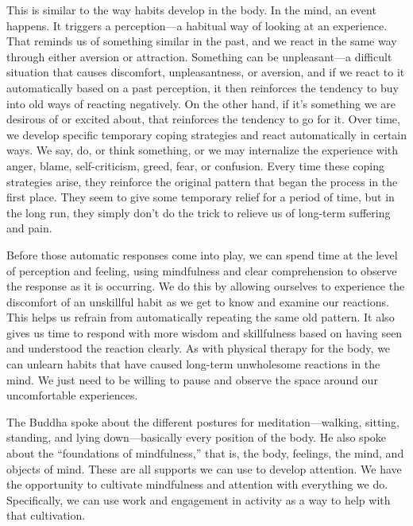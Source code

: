 This is similar to the way habits develop in the body. In the mind, an 
event happens. It triggers a perception---a habitual way of looking at 
an experience. That reminds us of something similar in the past, and we 
react in the same way through either aversion or attraction. Something 
can be unpleasant---a difficult situation that causes discomfort, 
unpleasantness, or aversion, and if we react to it automatically based 
on a past perception, it then reinforces the tendency to buy into old 
ways of reacting negatively. On the other hand, if it's something we 
are desirous of or excited about, that reinforces the tendency to go 
for it. Over time, we develop specific temporary coping strategies and 
react automatically in certain ways. We say, do, or think something, or 
we may internalize the experience with anger, blame, self-criticism, 
greed, fear, or confusion. Every time these coping strategies arise, 
they reinforce the original pattern that began the process in the first 
place. They seem to give some temporary relief for a period of time, 
but in the long run, they simply don't do the trick to relieve us of 
long-term suffering and pain.

Before those automatic responses come into play, we can spend time at 
the level of perception and feeling, using mindfulness and clear 
comprehension to observe the response as it is occurring. We do this by 
allowing ourselves to experience the discomfort of an unskillful habit 
as we get to know and examine our reactions. This helps us refrain from 
automatically repeating the same old pattern. It also gives us time to 
respond with more wisdom and skillfulness based on having seen and 
understood the reaction clearly. As with physical therapy for the body, 
we can unlearn habits that have caused long-term unwholesome reactions 
in the mind. We just need to be willing to pause and observe the space 
around our uncomfortable experiences.


The Buddha spoke about the different postures for meditation---walking, 
sitting, standing, and lying down---basically every position of the 
body. He also spoke about the ``foundations of mindfulness,'' that is, 
the body, feelings, the mind, and objects of mind. These are all 
supports we can use to develop attention. We have the opportunity to 
cultivate mindfulness and attention with everything we do. 
Specifically, we can use work and engagement in activity as a way to 
help with that cultivation.

